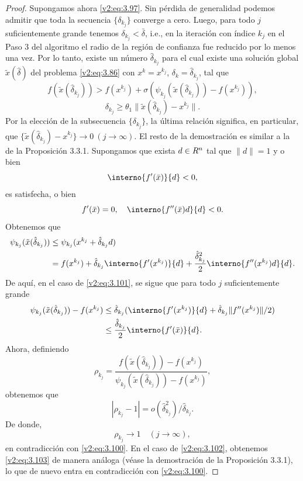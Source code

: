 \begin{proof}
    Supongamos ahora \eqref{v2:eq:3.97}. Sin pérdida de generalidad podemos admitir que toda la secuencia $\{\delta_{k_j}\}$ converge a cero. Luego, para todo $j$ suficientemente grande tenemos $\delta_{k_j} < \bar{\delta}$, i.e., en la iteración con índice $k_j$ en el Paso 3 del algoritmo el radio de la región de confianza fue reducido por lo menos una vez. Por lo tanto, existe un número $\hat{\delta}_{k_j}$ para el cual existe una solución global $\tilde{x}(\hat{\delta})$ del problema \eqref{v2:eq:3.86} con $x^k = x^{k_j}$, $\delta_k = \hat{\delta}_{k_j}$, tal que
    \begin{equation}
        f(\tilde{x}(\hat{\delta}_{k_j})) > f(x^{k_j}) + \sigma (\psi_{k_j}(\tilde{x}(\hat{\delta}_{k_j})) - f(x^{k_j})),
        \label{v2:eq:3.100}
    \end{equation}
    \[
        \delta_{k_j} \ge \theta_1 \|\tilde{x}(\hat{\delta}_{k_j}) - x^{k_j}\|.
    \]
    Por la elección de la subsecuencia $\{\delta_{k_j}\}$, la última relación significa, en particular, que $\{\tilde{x}(\hat{\delta}_{k_j}) - x^{k_j}\} \to 0 \ (j \to \infty)$.
    El resto de la demostración es similar a la de la Proposición 3.3.1. Supongamos que exista $d \in R^n$ tal que $\|d\| = 1$ y o bien
    \begin{equation}
        \interno{f'(\bar{x})}{d} < 0,
        \label{v2:eq:3.101}
    \end{equation}
    es satisfecha, o bien
    \begin{equation}
        f'(\bar{x}) = 0, \quad \interno{f''(\bar{x})d}{d} < 0.
        \label{v2:eq:3.102}
    \end{equation}
    Obtenemos que
    \begin{align*}
        \psi_{k_j}(\tilde{x}(\hat{\delta}_{k_j})) &\le \psi_{k_j}(x^{k_j} + \hat{\delta}_{k_j} d) \\
        &= f(x^{k_j}) + \hat{\delta}_{k_j}\interno{f'(x^{k_j})}{d} + \frac{\hat{\delta}_{k_j}^2}{2}\interno{f''(x^{k_j})d}{d}.
    \end{align*}
    De aquí, en el caso de \eqref{v2:eq:3.101}, se sigue que para todo $j$ suficientemente grande
    \begin{align*}
        \psi_{k_j}(\tilde{x}(\hat{\delta}_{k_j})) - f(x^{k_j}) &\le \hat{\delta}_{k_j}(\interno{f'(x^{k_j})}{d} + \hat{\delta}_{k_j}\|f''(x^{k_j})\| / 2) \\
        &\le \frac{\hat{\delta}_{k_j}}{2}\interno{f'(\bar{x})}{d}.
    \end{align*}
    Ahora, definiendo
    \[
        \rho_{k_j} = \frac{f(\tilde{x}(\hat{\delta}_{k_j})) - f(x^{k_j})}{\psi_{k_j}(\tilde{x}(\hat{\delta}_{k_j})) - f(x^{k_j})},
    \]
    obtenemos que
    \[
        |\rho_{k_j} - 1| = o(\hat{\delta}_{k_j}^2) / \hat{\delta}_{k_j}.
    \]
    De donde,
    \begin{equation}
        \rho_{k_j} \to 1 \quad (j \to \infty),
        \label{v2:eq:3.103}
    \end{equation}
    en contradicción con \eqref{v2:eq:3.100}.
    En el caso de \eqref{v2:eq:3.102}, obtenemos \eqref{v2:eq:3.103} de manera análoga (véase la demostración de la Proposición 3.3.1), lo que de nuevo entra en contradicción con \eqref{v2:eq:3.100}.
    

\end{proof}
